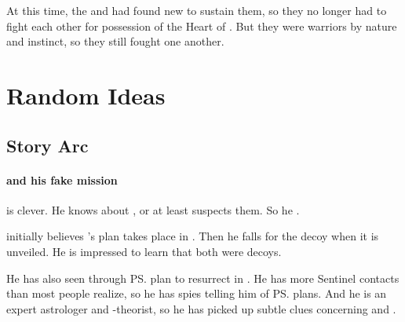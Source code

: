 At this time, the \dragons and \resphain had found new \dweomers to sustain them, so they no longer had to fight each other for possession of the Heart of \Miith. 
But they were warriors by nature and instinct, so they still fought one another. 























\chapter{Random Ideas}












\section{\Shilred{} Story Arc}





\subsubsection[Ishnaruchaefir and his fake mission]{\Ishnaruchaefir{} and his fake mission}
\Ishnaruchaefir{} is clever. He knows about , or at least suspects them. So he . 

\Ishnaruchaefir initially believes \Secherdamon's plan takes place in \Malcur.
Then he falls for the \Forclin decoy when it is unveiled. 
He is impressed to learn that both were decoys. 

He has also seen through \ps{\Secherdamon} plan to resurrect \Nithdornazsh{} in \Malcur. 
He has more Sentinel contacts than most people realize, so he has spies telling him of \ps{\Secherdamon} plans. 
And he is an expert astrologer and \matrix-theorist, so he has picked up subtle clues concerning \Nithdornazsh{} and \Malcur. 

